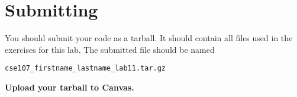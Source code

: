 \documentclass[11pt]{cselabheader}
\begin{document}
\pagebreak
\section{Submitting}
You should submit your code as a tarball. It should contain all files
used in the exercises for this lab. The submitted file should be named
\begin{center}
  \texttt{cse107\_firstname\_lastname\_lab11.tar.gz}
\end{center}

\begin{center}
  \textbf{Upload your tarball to Canvas.}
\end{center}

\listoftheorems
\end{document}
